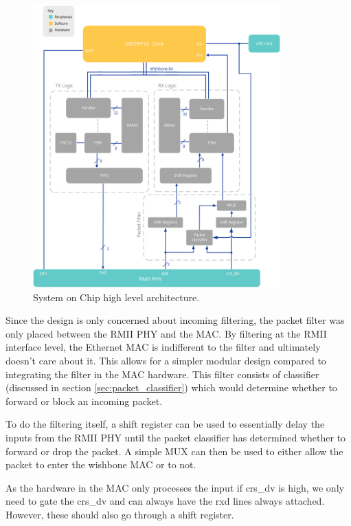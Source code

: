 \begin{figure}[h]
    \centering
    \includegraphics[width=0.85\textwidth]{Images/SoCArchitecture.png}
    \caption[System on Chip high level architecture]{System on Chip high level architecture.}
    \label{fig:soc_architecture}
\end{figure}

\newpage

\noindent Since the design is only concerned about incoming filtering, the packet filter was only placed between the RMII PHY and the MAC. By filtering at the RMII interface level, the Ethernet MAC is indifferent to the filter and ultimately doesn't care about it. This allows for a simpler modular design compared to integrating the filter in the MAC hardware. This filter consists of classifier (discussed in section \ref{sec:packet_classifier}) which would determine whether to forward or block an incoming packet.

To do the filtering itself, a shift register can be used to essentially delay the inputs from the RMII PHY until the packet classifier has determined whether to forward or drop the packet. A simple MUX can then be used to either allow the packet to enter the wishbone MAC or to not. 

As the hardware in the MAC only processes the input if crs\_dv is high, we only need to gate the crs\_dv and can always have the rxd lines always attached. However, these should also go through a shift register.

